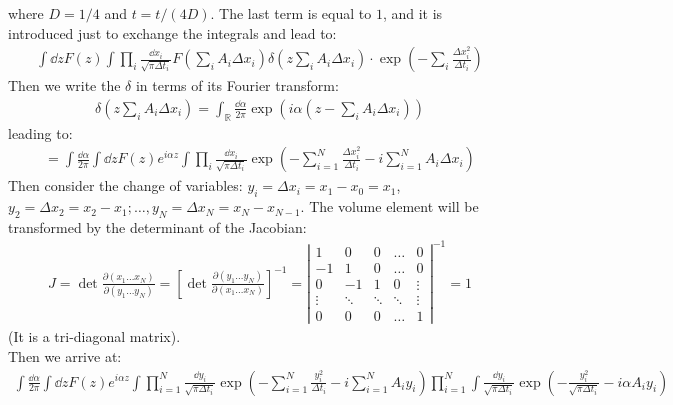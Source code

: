 \documentclass[../template.tex]{subfiles}
\begin{document}
where $D=1/4$ and $t = t/(4D)$. The last term is equal to $1$, and it is introduced just to exchange the integrals and lead to:
\begin{align*}
    \int \dd{z} F(z) \int \prod_i \frac{\dd{x_i}}{\sqrt{\pi \Delta t_i}} F\left(\sum_i A_i \Delta x_i\right) \delta\left(z \sum_i A_i \Delta x_i\right) \cdot \exp\left(-\sum_i \frac{\Delta x_i^2}{\Delta t_i} \right)
\end{align*}   
Then we write the $\delta$ in terms of its Fourier transform:
\begin{align*}
    \delta(z \sum_i A_i \Delta x_i) = \int_{\mathbb{R}} \frac{\dd{\alpha}}{2\pi} \exp(i \alpha (z- \sum_i A_i \Delta x_i)) 
\end{align*} 
leading to:
\begin{align*}
    = \int \frac{\dd{\alpha}}{2 \pi} \int \dd{z} F(z) e^{i \alpha z} \int \prod_i \frac{\dd{x_i}}{\sqrt{\pi \Delta t_i}} \exp \left(-\sum_{i=1}^N \frac{\Delta x_i^2}{\Delta t_i} - i \sum_{i=1}^N A_i \Delta x_i \right)  
\end{align*}
Then consider the change of variables: $y_i = \Delta x_i = x_1 - x_0 = x_1$, $y_2 = \Delta x_2 = x_2 - x_1; \dots, y_N = \Delta x_N = x_N - x_{N-1}$. The volume element will be transformed by the determinant of the Jacobian:
\begin{align*}
    J = \operatorname{det} \frac{\partial (x_1 \dots x_N)}{\partial(y_1 \dots y_N)} = \left[\operatorname{det} \frac{\partial (y_1 \dots y_N)}{\partial (x_1 \dots x_N)}  \right]^{-1} = \left|
    \begin{array}{ccccc}
    1 & 0 & 0 & \dots & 0 \\ 
    -1 & 1 & 0 & \dots & 0 \\ 
    0 & -1 & 1 & 0 & \vdots \\ 
    \vdots & \ddots & \ddots & \ddots & \vdots \\ 
    0 & 0 & 0 & \dots & 1
    \end{array}
    \right|^{-1} = 1
\end{align*}
(It is a tri-diagonal matrix).\\
Then we arrive at:
\begin{align*}
    \int \frac{\dd{\alpha}}{2 \pi} \int \dd{z} F(z) e^{i \alpha z} \int \prod_{i=1}^N \frac{\dd{y_i}}{\sqrt{\pi \Delta t_i}} \exp\left(-\sum_{i=1}^N \frac{y_i^2}{\Delta t_i} - i \sum_{i=1}^N A_i y_i \right) \prod_{i=1}^N \int \frac{\dd{y_i}}{\sqrt{\pi \Delta t_i}} \exp\left(-\frac{y_i^2}{\sqrt{\pi \Delta t_i}} - i \alpha A_i y_i \right)   
\end{align*}
\end{document}
